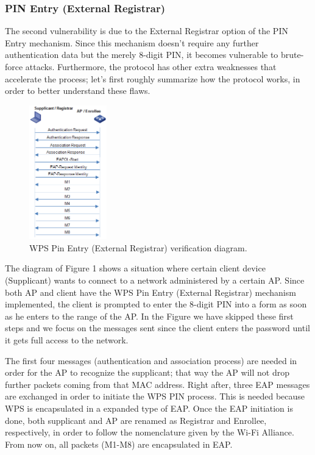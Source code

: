 \documentclass[a4paper,11pt]{article}
\begin{document}
\subsubsection{PIN Entry (External Registrar)}
The second vulnerability is due to the External Registrar option of the PIN Entry mechanism. Since this mechanism doesn't require any further authentication data but the merely 8-digit PIN, it becomes vulnerable to brute-force attacks. Furthermore, the protocol has other extra weaknesses that accelerate the process; let's first roughly summarize how the protocol works, in order to better understand these flaws.\\
\begin{figure}
  \vspace{-24pt}
  \begin{center}
    \includegraphics[width=0.3\textwidth]{./conversation}
  \end{center}
  \vspace{-20pt}
  \caption{WPS Pin Entry (External Registrar) verification diagram.}
  \vspace{-10pt}
\end{figure}
The diagram of Figure 1 shows a situation where certain client device (Supplicant) wants to connect to a network administered by a certain AP. Since both AP and client have the WPS Pin Entry (External Registrar) mechanism implemented, the client is prompted to enter the 8-digit PIN into a form as soon as he enters to the range of the AP. In the Figure we have skipped these first steps and we focus on the messages sent since the client enters the password until it gets full access to the network.

The first four messages (authentication and association process) are needed in order for the AP to recognize the supplicant; that way the AP will not drop further packets coming from that MAC address. Right after, three EAP messages are exchanged in order to initiate the WPS PIN process. This is needed because WPS is encapsulated in a expanded type of EAP. Once the EAP initiation is done, both supplicant and AP are renamed as Registrar and Enrollee, respectively, in order to follow the nomenclature given by the Wi-Fi Alliance. From now on, all packets (M1-M8) are encapsulated in EAP.
\end{document}
